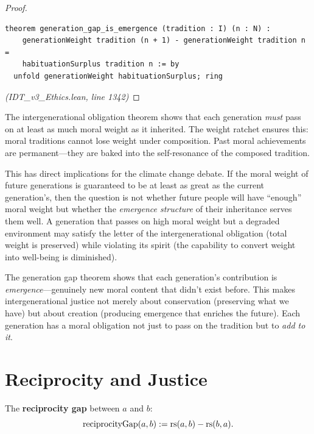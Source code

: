 \begin{proof}
\begin{lstlisting}
theorem generation_gap_is_emergence (tradition : I) (n : N) :
    generationWeight tradition (n + 1) - generationWeight tradition n =
    habituationSurplus tradition n := by
  unfold generationWeight habituationSurplus; ring
\end{lstlisting}
\textit{(IDT\_v3\_Ethics.lean, line 1342)}
\end{proof}

\begin{interpretation}
The intergenerational obligation theorem shows that each generation
\emph{must} pass on at least as much moral weight as it inherited. The
weight ratchet ensures this: moral traditions cannot lose weight under
composition. Past moral achievements are permanent---they are baked into
the self-resonance of the composed tradition.

This has direct implications for the climate change debate. If the moral
weight of future generations is guaranteed to be at least as great as
the current generation's, then the question is not whether future people
will have ``enough'' moral weight but whether the \emph{emergence structure}
of their inheritance serves them well. A generation that passes on high
moral weight but a degraded environment may satisfy the letter of the
intergenerational obligation (total weight is preserved) while violating
its spirit (the capability to convert weight into well-being is diminished).

The generation gap theorem shows that each generation's contribution is
\emph{emergence}---genuinely new moral content that didn't exist before.
This makes intergenerational justice not merely about conservation (preserving
what we have) but about creation (producing emergence that enriches the
future). Each generation has a moral obligation not just to pass on the
tradition but to \emph{add to it}.
\end{interpretation}

\section{Reciprocity and Justice}
\label{sec:reciprocity}

\begin{definition}
\label{def:reciprocity-gap}
The \textbf{reciprocity gap} between $a$ and $b$:
\[
  \mathrm{reciprocityGap}(a, b) := \mathrm{rs}(a, b) - \mathrm{rs}(b, a).
\]
\end{definition}

